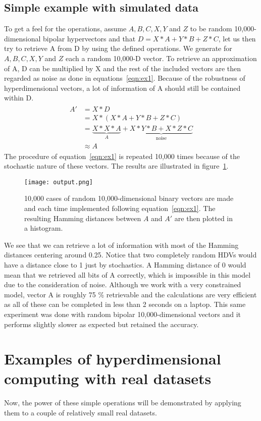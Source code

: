 \subsection*{Simple example with simulated data}
To get a feel for the operations, assume $A, B, C, X, Y$ and $Z$ to be random 10,000-dimensional bipolar hypervectors and that $D = X*A + Y*B + Z*C$, let us then try to retrieve A from D by using the defined operations. We generate for $A, B, C, X, Y$ and $Z$ each a random 10,000-D vector. To retrieve an approximation of A, D can be multiplied by X and the rest of the included vectors are then regarded as noise as done in equations~\ref{eqn:ex1}. Because of the robustness of hyperdimensional vectors, a lot of information of A should still be contained within D.
\begin{align}\label{eqn:ex1}
\begin{split}
    A' &= X * D \\
    &= X * (X * A + Y * B + Z * C) \\
    &= \underbrace{X * X * A}_A + \underbrace{X * Y * B + X * Z * C}_\text{noise} \\
    &\approx A
\end{split}
\end{align}
 The procedure of equation~\ref{eqn:ex1} is repeated 10,000 times because of the stochastic nature of these vectors. The results are illustrated in figure~\ref{fig:exm1}.
\begin{figure}[h]
    \centering
    \texttt{[image: output.png]}
    \caption{10,000 cases of random 10,000-dimensional binary vectors are made and each time implemented following equation~\ref{eqn:ex1}. The resulting Hamming distances between $A$ and $A'$ are then plotted in a histogram.}
    \label{fig:exm1}
\end{figure}
We see that we can retrieve a lot of information with most of the Hamming distances centering around 0.25. Notice that two completely random HDVs would have a distance close to 1 just by stochastics. A Hamming distance of 0 would mean that we retrieved all bits of A correctly, which is impossible in this model due to the consideration of noise. Although we work with a very constrained model, vector A is roughly 75 \% retrievable and the calculations are very efficient as all of these can be completed in less than 2 seconds on a laptop. This same experiment was done with random bipolar 10,000-dimensional vectors and it performs slightly slower as expected but retained the accuracy.
\section{Examples of hyperdimensional computing with real datasets}
\label{sec:example}
Now, the power of these simple operations will be demonstrated by applying them to a couple of relatively small real datasets.
